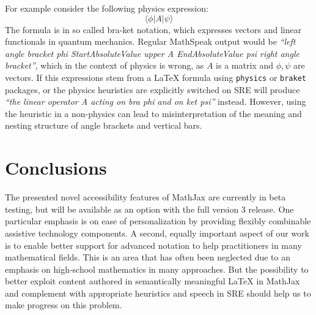 \documentclass{sig-alternate}
\begin{document}
For example consider the following physics expression:
\[\langle \phi |A|\psi \rangle\]
The formula is in so called bra-ket notation, which expresses vectors and linear
functionals in quantum mechanics. Regular MathSpeak output would be \emph{``left
  angle bracket phi StartAbsoluteValue upper A EndAbsoluteValue psi right angle
  bracket''}, which in the context of physics is wrong, as $A$ is a matrix and
$\phi,\psi$ are vectors. If this expressions stem from a {\LaTeX} formula using
\texttt{physics} or \texttt{braket} packages, or the physics heuristics are
explicitly switched on SRE will produce \emph{``the linear operator A acting on
  bra phi and on ket psi''} instead. However, using the heuristic in a
non-physics can lead to misinterpretation of the meaning and nesting structure
of angle brackets and vertical bars.








\section{Conclusions}
\label{sec:conc}

The presented novel accessibility features of MathJax are currently in beta
testing, but will be available as an option with the full version 3 release. One
particular emphasis is on ease of personalization by providing flexibly
combinable assistive technology components. A second, equally important aspect
of our work is to enable better support for advanced notation to help
practitioners in many mathematical fields. This is an area that has often been
neglected due to an emphasis on high-school mathematics in many approaches. But
the possibility to better exploit content authored in semantically meaningful
{\LaTeX} in MathJax and complement with appropriate heuristics and speech in SRE
should help us to make progress on this problem.
\end{document}

